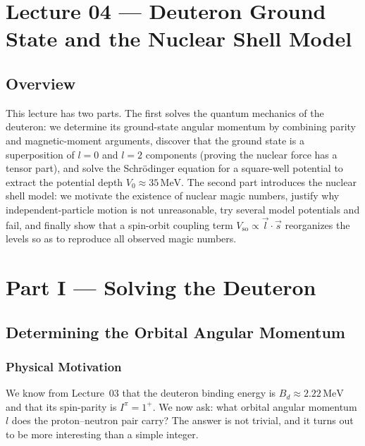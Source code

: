 
\section{Lecture 04 — Deuteron Ground State and the Nuclear Shell Model}
\label{sec:lec04}
\date{5 May 2026}

\subsection*{Overview}
This lecture has two parts.  The first solves the quantum mechanics of the
deuteron: we determine its ground-state angular momentum by combining parity
and magnetic-moment arguments, discover that the ground state is a
superposition of $l=0$ and $l=2$ components (proving the nuclear force has a
tensor part), and solve the Schrödinger equation for a square-well potential to
extract the potential depth $V_0\approx35\,\mathrm{MeV}$.  The second part
introduces the nuclear shell model: we motivate the existence of nuclear magic
numbers, justify why independent-particle motion is not unreasonable, try
several model potentials and fail, and finally show that a spin-orbit coupling
term $V_\mathrm{so}\propto\vec{l}\cdot\vec{s}$ reorganizes the levels so as
to reproduce all observed magic numbers.


\section{Part I — Solving the Deuteron}

\subsection{Determining the Orbital Angular Momentum}

\subsubsection*{Physical Motivation}
We know from Lecture~03 that the deuteron binding energy is
$B_d\approx2.22\,\mathrm{MeV}$ and that its spin-parity is $I^\pi=1^+$.  We
now ask: what orbital angular momentum $l$ does the proton–neutron pair carry?
The answer is not trivial, and it turns out to be more interesting than a simple
integer.

